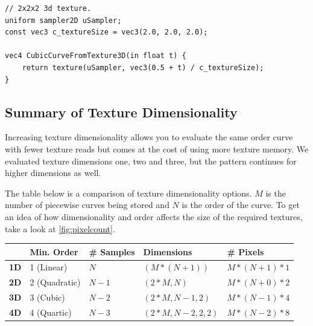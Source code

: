 \documentclass{jcgt}
\begin{document}
\begin{lstlisting}[caption={GLSL for evaluating a cubic curve encoded in a $(2,2,2)$ pixel 3d texture.  Trilinear texture sampling used to evaluate all three levels of the De Casteljeau algorithm.}, label={lst:GLSLCubicTexture3D}]
// 2x2x2 3d texture.
uniform sampler2D uSampler; 
const vec3 c_textureSize = vec3(2.0, 2.0, 2.0);

vec4 CubicCurveFromTexture3D(in float t) {
    return texture(uSampler, vec3(0.5 + t) / c_textureSize);
}
\end{lstlisting} 

\subsection{Summary of Texture Dimensionality}

Increasing texture dimensionality allows you to evaluate the same order curve with fewer texture reads but comes at the cost of using more texture memory.  We evaluated texture dimensions one, two and three, but the pattern continues for higher dimensions as well.

The table below is a comparison of texture dimensionality options.  $M$ is the number of piecewise curves being stored and $N$ is the order of the curve.  To get an idea of how dimensionality and order affects the size of the required textures, take a look at \autoref{fig:pixelcount}.

\begin{tabular}{|l|l|l|l|l|}
\hline
 & \bf{Min. Order} & \bf{\# Samples} & \bf{Dimensions} & \bf{\# Pixels} \\ \hline
\bf{1D} & 1 (Linear) & $N$ & $(M*(N+1))$ & $M*(N+1)*1$ \\ \hline
\bf{2D} & 2 (Quadratic) & $N-1$ & $(2*M,N)$ & $M*(N+0)*2$\\ \hline
\bf{3D} & 3 (Cubic) & $N-2$ & $(2*M,N-1,2)$ & $M*(N-1)*4$\\ \hline
\bf{4D} & 4 (Quartic) & $N-3$ & $(2*M,N-2,2,2)$ & $M*(N-2)*8$\\ \hline
\end{tabular}
\end{document}
